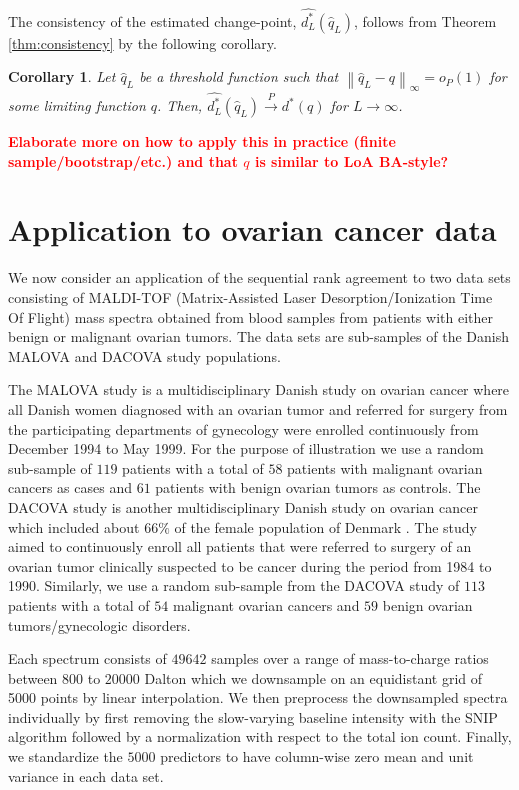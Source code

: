\documentclass[12pt,a4paper]{article}
\newcommand{\mcomment}[1]{\textcolor{red}{\textbf{#1}}}
\theoremstyle{plain}
\newtheorem{corollary}{Corollary}
\begin{document}
The consistency of the estimated change-point, $\widehat{d^\ast_L}(\widehat{q}_L)$, follows from Theorem \ref{thm:consistency} by the following corollary. 
\begin{corollary}
Let $\widehat{q}_L$ be a threshold function such that $\left\|\widehat{q}_L - q\right\|_\infty = o_P(1)$ for some limiting
function $q$.  Then, $\widehat{d^\ast_L}(\widehat{q}_L) \overset{P}{\longrightarrow} d^\ast(q)$ for $L \rightarrow \infty$.
\label{cor:consistency}
\end{corollary}



\mcomment{Elaborate more on how to apply this in practice (finite sample/bootstrap/etc.) and that $q$ is similar to LoA BA-style?}





\section{Application to ovarian cancer data}
We now consider an application of the sequential rank agreement to two
data sets consisting of MALDI-TOF (Matrix-Assisted Laser
Desorption/Ionization Time Of Flight) mass spectra obtained from blood
samples from patients with either benign or malignant ovarian
tumors. The data sets are sub-samples of the Danish MALOVA and DACOVA
study populations.

The MALOVA study is a multidisciplinary Danish study on ovarian cancer
\citep{Hogdall:2004:Cancer:15160342} where all Danish women diagnosed
with an ovarian tumor and referred for surgery from the participating
departments of gynecology were enrolled continuously from December
1994 to May 1999. For the purpose of illustration we use a random
sub-sample of $119$ patients with a total of $58$ patients with
malignant ovarian cancers as cases and $61$ patients with benign
ovarian tumors as controls. The DACOVA study is another
multidisciplinary Danish study on ovarian cancer which included about
$66\%$ of the female population of Denmark
\citep{bertelsen1991protocol}. The study aimed to continuously enroll
all patients that were referred to surgery of an ovarian tumor
clinically suspected to be cancer during the period from 1984 to
1990. Similarly, we use a random sub-sample from the DACOVA study of
$113$ patients with a total of $54$ malignant ovarian cancers and $59$
benign ovarian tumors/gynecologic disorders.

Each spectrum consists of $49642$ samples over a range of mass-to-charge ratios
between $800$ to $20000$ Dalton which we downsample on an equidistant grid of
5000 points by linear interpolation. We then preprocess the downsampled
spectra individually by first removing the slow-varying baseline intensity
with the SNIP algorithm \citep{ryan1988snip} followed by a
normalization with respect to the total ion count. Finally, we standardize
the $5000$ predictors to have column-wise zero mean and unit variance in
each data set.
\end{document}
